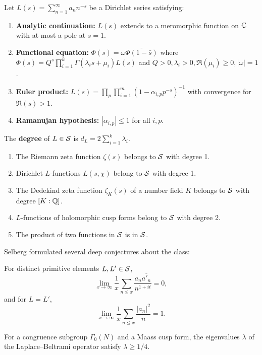 Let \(L(s) = \sum_{n=1}^{\infty} a_n n^{-s}\) be a Dirichlet series satisfying:
\begin{enumerate}
    \item [(S1)] \textbf{Analytic continuation:} \(L(s)\) extends to a meromorphic function on \(\mathbb{C}\) with at most a pole at \(s = 1\).
    \item [(S2)] \textbf{Functional equation:} \(\Phi(s) = \omega \overline{\Phi(1-\bar s)}\) where \(\Phi(s) = Q^s \prod_{i=1}^k \Gamma(\lambda_i s + \mu_i) L(s)\) and \(Q > 0, \lambda_i > 0, \Re(\mu_i) \geq 0, |\omega| = 1\).
    \item [(S3)] \textbf{Euler product:} \(L(s) = \prod_p \prod_{i=1}^m (1 - \alpha_{i,p} p^{-s})^{-1}\) with convergence for \(\Re(s) > 1\).
    \item [(S4)] \textbf{Ramanujan hypothesis:} \(|\alpha_{i,p}| \leq 1\) for all \(i, p\).
\end{enumerate}

The \textbf{degree} of \(L \in \mathcal{S}\) is \(d_L = 2 \sum_{i=1}^k \lambda_i\).

\begin{theorem}
\begin{enumerate}
    \item The Riemann zeta function \(\zeta(s)\) belongs to \(\mathcal{S}\) with degree 1.
    \item Dirichlet \(L\)-functions \(L(s,\chi)\) belong to \(\mathcal{S}\) with degree 1.
    \item The Dedekind zeta function \(\zeta_K(s)\) of a number field \(K\) belongs to \(\mathcal{S}\) with degree \([K:\mathbb{Q}]\).
    \item \(L\)-functions of holomorphic cusp forms belong to \(\mathcal{S}\) with degree 2.
    \item The product of two functions in \(\mathcal{S}\) is in \(\mathcal{S}\).
\end{enumerate}
\end{theorem}

Selberg formulated several deep conjectures about the class:

\begin{conjecture}
For distinct primitive elements \(L, L' \in \mathcal{S}\),
\[
\lim_{x \to \infty} \frac{1}{x} \sum_{n \leq x} \frac{a_n \overline{a'_n}}{n^{1+it}} = 0,
\]
and for \(L = L'\),
\[
\lim_{x \to \infty} \frac{1}{x} \sum_{n \leq x} \frac{|a_n|^2}{n} = 1.
\]
\end{conjecture}

\begin{conjecture}
For a congruence subgroup \(\Gamma_0(N)\) and a Maass cusp form, the eigenvalues \(\lambda\) of the Laplace--Beltrami operator satisfy \(\lambda \geq 1/4\).
\end{conjecture}


